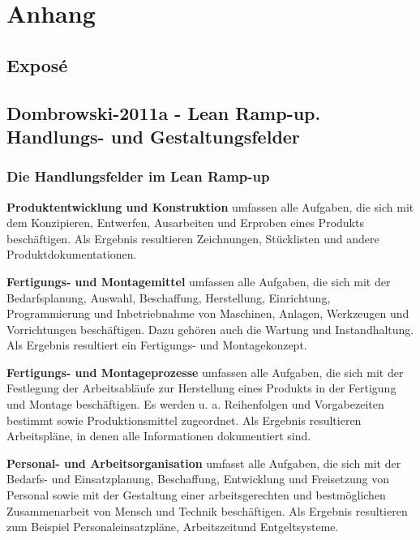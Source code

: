 \chapter{Anhang}
\section{Exposé}

\section{Dombrowski-2011a - Lean Ramp-up. Handlungs- und Gestaltungsfelder}
\subsection*{Die Handlungsfelder im Lean Ramp-up}\label{appendix:dom11a:hf}

\textbf{Produktentwicklung und Konstruktion}
umfassen alle Aufgaben, die sich mit
dem Konzipieren, Entwerfen, Ausarbeiten und Erproben eines Produkts
beschäftigen. Als Ergebnis resultieren Zeichnungen, Stücklisten und andere Produktdokumentationen.

\textbf{Fertigungs- und Montagemittel} umfassen alle Aufgaben, die sich mit der Bedarfsplanung, Auswahl, Beschaffung,
Herstellung, Einrichtung, Programmierung und Inbetriebnahme von Maschinen, Anlagen, Werkzeugen und
Vorrichtungen beschäftigen. Dazu gehören auch die Wartung und Instandhaltung. Als Ergebnis resultiert ein
Fertigungs- und Montagekonzept.

\textbf{Fertigungs- und Montageprozesse} umfassen alle Aufgaben, die sich mit der
Festlegung der Arbeitsabläufe zur
Herstellung eines Produkts in der
Fertigung und Montage beschäftigen.
Es werden u. a. Reihenfolgen und
Vorgabezeiten bestimmt sowie Produktionsmittel zugeordnet. Als Ergebnis resultieren Arbeitspläne, in
denen alle Informationen dokumentiert sind.

\textbf{Personal- und Arbeitsorganisation} umfasst alle Aufgaben, die sich mit der
Bedarfs- und Einsatzplanung, Beschaffung, Entwicklung und Freisetzung von Personal sowie mit der Gestaltung einer arbeitsgerechten und
bestmöglichen Zusammenarbeit von
Mensch und Technik beschäftigen.
Als Ergebnis resultieren zum Beispiel
Personaleinsatzpläne,
 Arbeitszeitund Entgeltsysteme.

